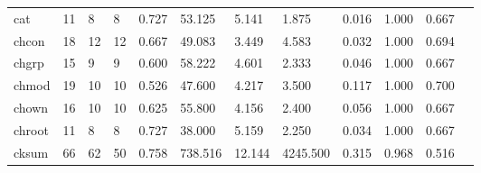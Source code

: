 \begin{longtable}{lp{1.00cm}p{1.00cm}p{1.00cm}p{1.00cm}p{1.00cm}p{1.00cm}p{1.00cm}p{1.00cm}p{1.00cm}p{1.00cm}p{1.00cm}}
cat       &                           11 &                  8 &                                 8 &                                      0.727 &                                 53.125 &                                        5.141 &                             1.875 &                                   0.016 &                        1.000 &                                        0.667 \\
chcon     &                           18 &                 12 &                                12 &                                      0.667 &                                 49.083 &                                        3.449 &                             4.583 &                                   0.032 &                        1.000 &                                        0.694 \\
chgrp     &                           15 &                  9 &                                 9 &                                      0.600 &                                 58.222 &                                        4.601 &                             2.333 &                                   0.046 &                        1.000 &                                        0.667 \\
chmod     &                           19 &                 10 &                                10 &                                      0.526 &                                 47.600 &                                        4.217 &                             3.500 &                                   0.117 &                        1.000 &                                        0.700 \\
chown     &                           16 &                 10 &                                10 &                                      0.625 &                                 55.800 &                                        4.156 &                             2.400 &                                   0.056 &                        1.000 &                                        0.667 \\
chroot    &                           11 &                  8 &                                 8 &                                      0.727 &                                 38.000 &                                        5.159 &                             2.250 &                                   0.034 &                        1.000 &                                        0.667 \\
cksum     &                           66 &                 62 &                                50 &                                      0.758 &                                738.516 &                                       12.144 &                          4245.500 &                                   0.315 &                        0.968 &                                        0.516 \\

\end{longtable}
